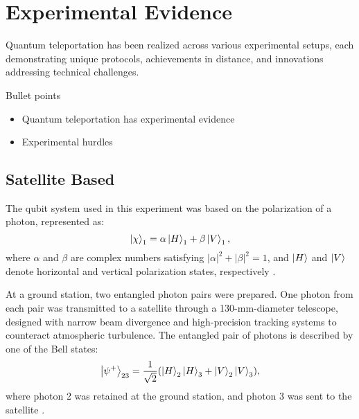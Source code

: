 \section{Experimental Evidence}
Quantum teleportation has been realized across various experimental setups, each demonstrating unique protocols,
achievements in distance, and innovations addressing technical challenges. 
\begin{mybox}{Bullet points}
    \begin{itemize}
        \item Quantum teleportation has experimental evidence
        \item Experimental hurdles
    \end{itemize}
\end{mybox}
\subsection{Satellite Based}


The qubit system used in this experiment was based on the polarization of a photon, represented as:  
\begin{equation}
    \ket{\chi}_1 = \alpha\ket{H}_1 + \beta\ket{V}_1,
\end{equation}
where \(\alpha\) and \(\beta\) are complex numbers satisfying \(|\alpha|^2 + |\beta|^2 = 1\), and \(\ket{H}\) and \(\ket{V}\) denote 
horizontal and vertical polarization states, respectively \cite{Ren:2017}.  

At a ground station, two entangled photon pairs were prepared. One photon from each pair was transmitted to a satellite through a 
130-mm-diameter telescope, designed with narrow beam divergence and high-precision tracking systems to counteract atmospheric turbulence. 
The entangled pair of photons is described by one of the Bell states:
\begin{equation}
    \ket{\psi^{+}}_{23} = \frac{1}{\sqrt{2}} (\ket{H}_2\ket{H}_3 + \ket{V}_2\ket{V}_3),
\end{equation}
where photon 2 was retained at the ground station, and photon 3 was sent to the satellite \cite{Ren:2017}.

